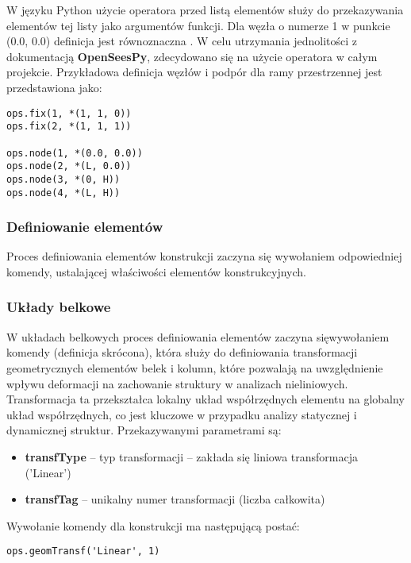 W języku Python użycie operatora \ilc{*} przed listą elementów służy do przekazywania elementów tej listy jako argumentów funkcji.
Dla węzła o numerze 1 w punkcie (0.0, 0.0) definicja  jest równoznaczna .
W celu utrzymania jednolitości z dokumentacją \textbf{OpenSeesPy}, zdecydowano się na użycie operatora \ilc{*} w całym projekcie.
Przykładowa definicja węzłów i podpór dla ramy przestrzennej jest przedstawiona jako:

\begin{lstlisting}
ops.fix(1, *(1, 1, 0))
ops.fix(2, *(1, 1, 1))

ops.node(1, *(0.0, 0.0))
ops.node(2, *(L, 0.0))
ops.node(3, *(0, H))
ops.node(4, *(L, H))
\end{lstlisting}

\subsubsection{Definiowanie elementów}

Proces definiowania elementów konstrukcji zaczyna się wywołaniem odpowiedniej komendy, ustalającej właściwości elementów konstrukcyjnych.

\subsubsection*{Układy belkowe}

W układach belkowych proces definiowania elementów zaczyna sięwywołaniem komendy  (definicja skrócona),
która służy do definiowania transformacji geometrycznych elementów belek i kolumn, które pozwalają na uwzględnienie wpływu
deformacji na zachowanie struktury w analizach nieliniowych. Transformacja ta przekształca lokalny układ współrzędnych elementu na globalny układ współrzędnych, co jest kluczowe w przypadku analizy statycznej i dynamicznej struktur.
Przekazywanymi parametrami są:

\begin{itemize}
    \item \textbf{transfType} – typ transformacji – zakłada się liniowa transformacja ('Linear')
    \item \textbf{transfTag} – unikalny numer transformacji (liczba całkowita)
\end{itemize}

Wywołanie komendy dla konstrukcji ma następującą postać:

\begin{lstlisting}
ops.geomTransf('Linear', 1)
\end{lstlisting}

